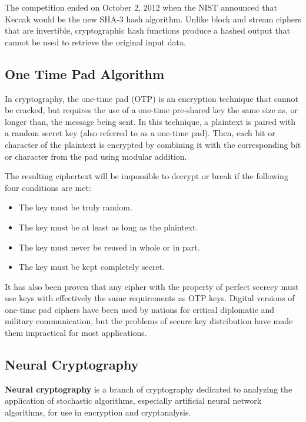 \documentclass[a4paper]{article}
\begin{document}
    The competition ended on October 2, 2012 when the NIST 
    announced that Keccak would be the new SHA-3 hash algorithm. Unlike block and stream 
    ciphers that are invertible, cryptographic hash functions produce a hashed output that 
    cannot be used to retrieve the original input data. 

    \subsection{One Time Pad Algorithm}
    In cryptography, the one-time pad (OTP) is an encryption technique that cannot be cracked, 
    but requires the use of a one-time pre-shared key the same size as, or longer than, the message 
    being sent. In this technique, a plaintext is paired with a random secret key (also referred 
    to as a one-time pad). Then, each bit or character of the plaintext is encrypted by combining 
    it with the corresponding bit or character from the pad using modular addition.

    The resulting ciphertext will be impossible to decrypt\cite{otpinvent} or break if the following 
    four conditions are met:
    \begin{itemize}
      \item The key must be truly random.
      \item The key must be at least as long as the plaintext.
      \item The key must never be reused in whole or in part.
      \item The key must be kept completely secret.
    \end{itemize}

    It has also been proven that any cipher with the property of perfect secrecy must use keys 
    with effectively the same requirements as OTP keys. Digital versions of one-time pad 
    ciphers have been used by nations for critical diplomatic and military communication, 
    but the problems of secure key distribution have made them impractical for most applications.

    \subsection{Neural Cryptography}
    {\bfseries Neural cryptography} is a branch of cryptography dedicated to analyzing the 
    application of stochastic algorithms, especially artificial neural network algorithms, 
    for use in encryption and cryptanalysis.
\end{document}
